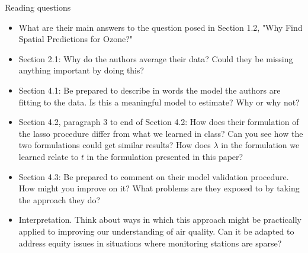 \documentclass[mathserif, aspectratio=169]{beamer}
\begin{document}
\begin{frame}{Reading questions}

\begin{itemize}
\item What are their main answers to the question posed in Section 1.2, "Why Find Spatial Predictions for Ozone?"
\item Section 2.1: Why do the authors average their data?  Could they be missing anything important by doing this?
\item Section 4.1: Be prepared to describe in words the model the authors are fitting to the data.  Is this a meaningful model to estimate?  Why or why not?
\item Section 4.2, paragraph 3 to end of Section 4.2:  How does their formulation of the lasso procedure differ from what we learned in class?  Can you see how the two formulations could get similar results?  How does $\lambda$ in the formulation we learned relate to $t$ in the formulation presented in this paper? 
\item Section 4.3: Be prepared to comment on their model validation procedure.  How might you improve on it?  What problems are they exposed to by taking the approach they do?
\item Interpretation.  Think about ways in which this approach might be practically applied to improving our understanding of air quality.  Can it be adapted to address equity issues in situations where monitoring stations are sparse?
\end{itemize}
\end{frame}
\end{document}
